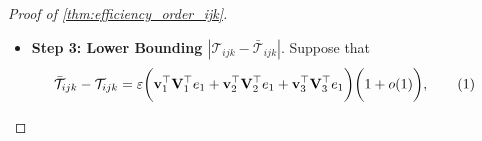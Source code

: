 \documentclass[10pt]{article}
\newcommand{\0}{{\mathbf{0}}}
\newcommand{\1}{{\mathbf{1}}}
\newcommand{\I}{{\mathbf{I}}}
\renewcommand{\t}{^{\top}}
\newcommand{\eps}{\varepsilon}
\newcommand{\inv}{^{-1}}
\newcommand\numberthis{\addtocounter{equation}{1}\tag{\theequation}}
\begin{document}
\begin{proof}[Proof of \cref{thm:efficiency_order_ijk}]
\begin{itemize}
\begin{itemize}
\begin{align*}
    \end{align*}
    Next, note that $\mathcal{M}_1(\mathcal{C}) (\mathbf{\bar U}_2\otimes \mathbf{\bar U}_3)\t$ has the same nonzero singular values as $\mathcal{M}_1(\mathcal{C})$ and hence also $\mathcal{T}$.  Therefore, $\| \mathbf{\Lambda}_k\inv \mathcal{M}_1(\mathcal{C}) \big( \mathbf{\bar U}_2 \otimes \mathbf{\bar U}_3\big)\t \| =  1$.  As a consequence,
    \begin{align*}
        \alpha_1 \leq \eps.
    \end{align*}
    \item \textbf{Bounding $\alpha_2$.}  We observe that
    \begin{align*}
        \alpha_2 &\leq \frac{\eps \sqrt{r_1}}{\lambda} \lambda_1 \| \mathbf{C}_{\Delta_1}^{-1/2} - \I \| \leq \eps \frac{\eps^2 \kappa r^{3/2}}{\lambda^2}\leq \eps \frac{\eps^2 \kappa r^{3/2}}{(\lambda/\sigma)^2}\leq \eps,
    \end{align*}
    where we have used the assumption that $\lambda/\sigma \geq C_0 r \kappa \sqrt{p}$, together with the previous bounds.
    \item \textbf{Bounding $\alpha_3$.} We have that
    \begin{align*}
        \alpha_3 &\leq \| \mathbf{C}_{\Delta_1}^{-1/2} - \I \| \lambda_1 \sqrt{r_1}\\
        &\leq \eps \frac{\eps r_1^{3/2} \kappa }{\lambda} \\
        &\leq \eps\frac{\eps r_1^{3/2} \kappa }{\lambda/\sigma} \\
        &\leq \eps,
    \end{align*}
    where we have used the assumptions $\lambda/\sigma \geq C_0 \kappa r \sqrt{p}$ and $r_k \leq p_{\max}^{1/2}$.  
\end{itemize}
As a consequence, we have that
\begin{align*}
    \| \mathcal{\bar T} - \mathcal{T} \|_F &\leq 9 \eps.
\end{align*}Therefore,
\begin{align*}
    \chi^2(f_{{\pi_{\mathcal{H}_1}}}, f_{\pi_{\mathcal{H}_0}}) \leq \exp\bigg( 81 \eps^2 \bigg) - 1.
\end{align*}
    \item \textbf{Step 3: Lower Bounding $|\mathcal{T}_{ijk} - \mathcal{\bar T}_{ijk}|$}.
Suppose that
\begin{align*}
   \mathcal{\bar T}_{ijk} - \mathcal{T}_{ijk} &= \eps \bigg(     \mathbf{v}_1\t \mathbf{V}_1\t e_{1} +    \mathbf{v}_2\t  \mathbf{V}_2\t e_{1} + \mathbf{v}_3\t  \mathbf{V}_3\t e_{1} \bigg) \bigg( 1 + o(1) \bigg), \numberthis \label{eq:desiredbound}

\end{align*}
\end{itemize}
\end{proof}
\end{document}
